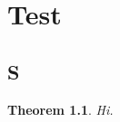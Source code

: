 \documentclass{book}
\newtheorem{theorem}{Theorem}
\begin{document}
\chapter{Test}\section{S}
\begin{theorem}\label{t:x}Hi.\end{theorem}
\end{document}
